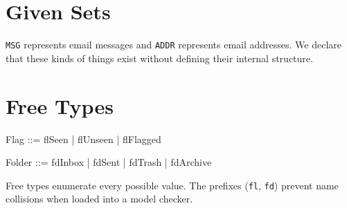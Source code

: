 \documentclass{article}
\begin{document}
\section{Given Sets}

\begin{zed}
\end{zed}

\texttt{MSG} represents email messages and \texttt{ADDR}
represents email addresses. We declare that these kinds of
things exist without defining their internal structure.

\section{Free Types}

\begin{zed}
  Flag ::= flSeen | flUnseen | flFlagged
\end{zed}

\begin{zed}
  Folder ::= fdInbox | fdSent | fdTrash | fdArchive
\end{zed}

Free types enumerate every possible value. The prefixes
(\texttt{fl}, \texttt{fd}) prevent name collisions when
loaded into a model checker.
\end{document}
